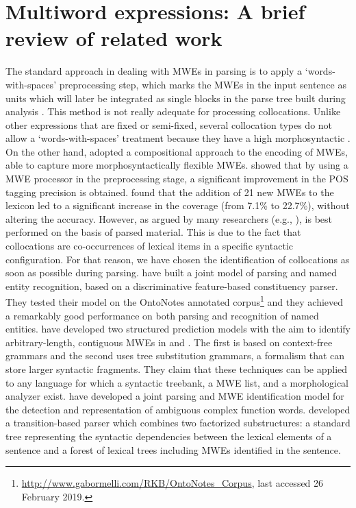\documentclass[output=paper]{langsci/langscibook}
\begin{document}
\section{Multiword expressions: A brief review of related work}
\label{fou:sec2}
The standard approach in dealing with MWEs in parsing is to apply a `words-with-spaces' preprocessing step, which marks the MWEs in the input sentence as units which will later be integrated as single blocks in the parse tree built during analysis \citep{brun:1998,zhang06}. This method is not really adequate for processing collocations. Unlike other expressions that are fixed or semi-fixed, several collocation types do not allow a `words-with-spaces' treatment because they have a high morphosyntactic .
On the other hand, \cite{alegria04,villavicencio07} adopted a compositional approach to the encoding of MWEs, able to capture more morphosyntactically flexible MWEs. \cite{alegria04} showed that by using a MWE processor in the preprocessing stage, a significant improvement in the POS tagging precision is obtained. \cite{villavicencio07} found that the addition of 21 new MWEs to the lexicon led to a significant increase in the  coverage (from 7.1\% to 22.7\%), without altering the  accuracy.
However, as argued by many researchers (e.g., \citealt{heid94,seretan11}),  is best performed on the basis of parsed material. This is due to the fact that collocations are co-occurrences of lexical items in a specific syntactic configuration. For that reason, we have chosen the identification of collocations as soon as possible during parsing. 
\cite{finkeljr09} have built a joint model of parsing and named entity recognition, based on a discriminative feature-based constituency parser. They tested their model on the OntoNotes annotated corpus\footnote{\url{http://www.gabormelli.com/RKB/OntoNotes_Corpus}, last accessed 26 February 2019.} and they achieved a remarkably good performance on both parsing and recognition of named entities. \cite{green13} have developed two structured prediction models with the aim to identify arbitrary-length, contiguous MWEs in  and . The first is based on context-free grammars and the second uses tree substitution grammars, a formalism that can store larger syntactic fragments. They claim that these techniques can be applied to any language for which a syntactic treebank, a MWE list, and a morphological analyzer exist. \cite{nasretal15} have developed a joint parsing and MWE identification model for the detection and representation of ambiguous complex function words. \cite{constantnivre16} developed a transition-based parser which combines two factorized substructures: a standard tree representing the syntactic dependencies between the lexical elements of a sentence and a forest of lexical trees including MWEs identified in the sentence. 
\end{document}
